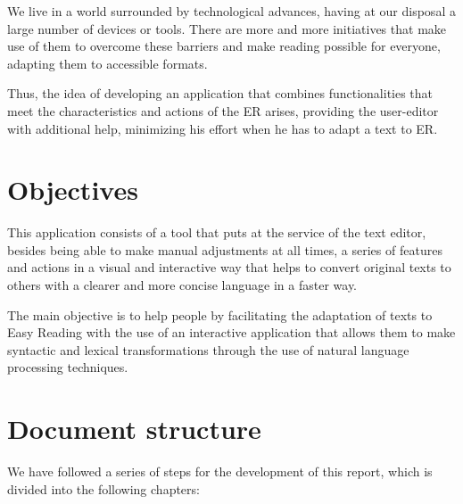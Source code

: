  \setlength{\parskip}{10pt}

We live in a world surrounded by technological advances, having at our disposal a large number of devices or tools. There are more and more initiatives that make use of them to overcome these barriers and make reading possible for everyone, adapting them to accessible formats. 

 \setlength{\parskip}{10pt}

Thus, the idea of developing an application that combines functionalities that meet the characteristics and actions of the ER arises, providing the user-editor with additional help, minimizing his effort when he has to adapt a text to ER.

\section{Objectives}
This application consists of a tool that puts at the service of the text editor, besides being able to make manual adjustments at all times, a series of features and actions in a visual and interactive way that helps to convert original texts to others with a clearer and more concise language in a faster way.  

 \setlength{\parskip}{10pt}

The main objective is to help people by facilitating the adaptation of texts to Easy Reading with the use of an interactive application that allows them to make syntactic and lexical transformations through the use of natural language processing techniques. 



\section{Document structure}


We have followed a series of steps for the development of this report, which is divided into the following chapters:

